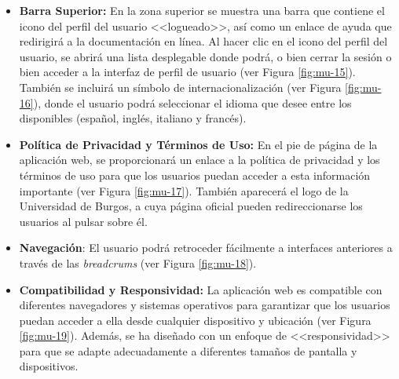 \begin{itemize} 
\item \textbf{Barra Superior:} En la zona superior se muestra una barra que contiene el icono del perfil del usuario <<logueado>>, así como un enlace de ayuda que redirigirá a la documentación en línea. Al hacer clic en el icono del perfil del usuario, se abrirá una lista desplegable donde podrá, o bien cerrar la sesión o bien acceder a la interfaz de perfil de usuario (ver Figura \ref{fig:mu-15}). También se incluirá un símbolo de internacionalización (ver Figura \ref{fig:mu-16}), donde el usuario podrá seleccionar el idioma que desee entre los disponibles (español, inglés, italiano y francés).
\item \textbf{Política de Privacidad y Términos de Uso:} En el pie de página de la aplicación web, se proporcionará un enlace a la política de privacidad y los términos de uso para que los usuarios puedan acceder a esta información importante (ver Figura \ref{fig:mu-17}). También aparecerá el logo de la Universidad de Burgos, a cuya página oficial pueden redireccionarse los usuarios al pulsar sobre él.
\item \textbf{Navegación}: El usuario podrá retroceder fácilmente a interfaces anteriores a través de las \textit{breadcrums} (ver Figura \ref{fig:mu-18}).
\item \textbf{Compatibilidad y Responsividad:} La aplicación web es compatible con diferentes navegadores y sistemas operativos para garantizar que los usuarios puedan acceder a ella desde cualquier dispositivo y ubicación (ver Figura \ref{fig:mu-19}). Además, se ha diseñado con un enfoque de <<responsividad>> para que se adapte adecuadamente a diferentes tamaños de pantalla y dispositivos.
\end{itemize}


